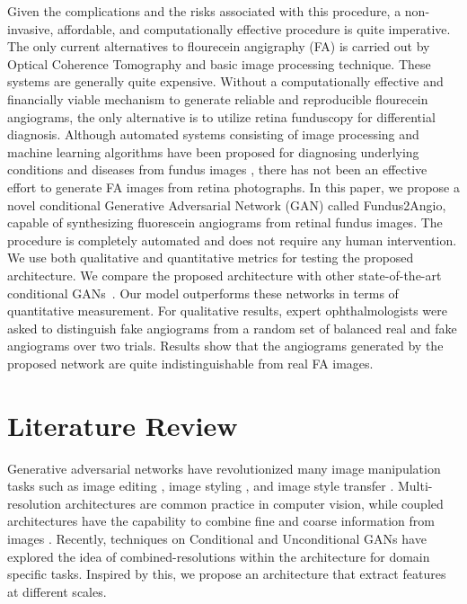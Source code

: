 \documentclass[runningheads]{llncs}
\begin{document}
Given the complications and the risks associated with this procedure, a non-invasive, affordable, and computationally effective procedure is quite imperative. The only current alternatives to flourecein angigraphy (FA) is carried out by Optical Coherence Tomography and basic image processing technique. These systems are generally quite expensive. Without a computationally effective and financially viable mechanism to generate reliable and reproducible flourecein angiograms, the only alternative is to utilize retina funduscopy for differential diagnosis. Although automated systems consisting of image processing and machine learning algorithms have been proposed for diagnosing underlying conditions and diseases from fundus images \cite{poplin2018prediction}, there has not been an effective effort to generate FA images from retina photographs. In this paper, we propose a novel conditional Generative Adversarial Network (GAN) called Fundus2Angio, capable of synthesizing fluorescein angiograms from retinal fundus images. The procedure is completely automated and does not require any human intervention. We use both qualitative and quantitative metrics for testing the proposed architecture. We compare the proposed architecture with other state-of-the-art conditional GANs~\cite{wang2018high,isola2017image,zhu2017unpaired}. Our model outperforms these networks in terms of quantitative measurement. For qualitative results, expert ophthalmologists were asked to distinguish fake angiograms from a random set of balanced real and fake angiograms over two trials. Results show that the angiograms generated by the proposed network are quite indistinguishable from real FA images.

\section{Literature Review}


Generative adversarial networks have revolutionized many image manipulation tasks such as image editing \cite{zhu2016generative}, image styling \cite{chen2018sketchygan}, and image style transfer \cite{zhu2017unpaired,wang2018high}. Multi-resolution architectures are common practice in computer vision, while coupled architectures have the capability to combine fine and coarse information from images \cite{brown2003recognising}. 
Recently, techniques on Conditional \cite{huang2017stacked} and Unconditional GANs \cite{chen2017photographic} have explored the idea of combined-resolutions within the architecture for domain specific tasks. Inspired by this, we propose an architecture that extract features at different scales.
\end{document}
